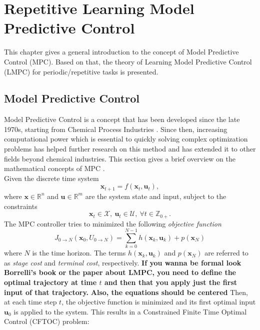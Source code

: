 \chapter{Repetitive Learning Model Predictive Control}
This chapter gives a general introduction to the concept of Model Predictive Control (MPC). Based on that, the theory of Learning Model Predictive Control (LMPC) for periodic/repetitive tasks is presented. %

\section{Model Predictive Control}
Model Predictive Control is a concept that has been developed since the late 1970s, starting from Chemical Process Industries \cite{garcia1989model}. Since then, increasing computational power which is essential to quickly solving complex optimization problems has helped further research on this method and has extended it to other fields beyond chemical industries.
This section gives a brief overview on the mathematical concepts of MPC \cite{Borrelli2003}.\\
Given the discrete time system
\begin{equation}
\bm{x}_{t+1}=f(\bm{x}_t,\bm{u}_t),
\end{equation}
where $\bm{x}\in \mathbb{R}^n$ and $\bm{u}\in\mathbb{R}^m$ are the system state and input, subject to the constraints
\begin{equation}
\bm{x}_t\in\mathcal{X},\ \bm{u}_t\in\mathcal{U},\ \forall t\in\mathbb{Z}_{0+}.
\end{equation}
The MPC controller tries to minimized the following \emph{objective function} 
\begin{equation}
J_{0\rightarrow N}(\bm{x}_0,U_{0\rightarrow N})=\sum_{k=0}^{N-1}h(\bm{x}_k,\bm{u}_k) + p(\bm{x}_N)
\end{equation}
where $N$ is the time horizon. The terms $h(\bm{x}_k,\bm{u}_k)$ and $p(\bm{x}_N)$ are referred to as \emph{stage cost} and \emph{terminal cost}, respectively. 
{\bfseries{If you wanna be formal look Borrelli's book or the paper about LMPC, you need to define the optimal trajectory at time $t$ and then that you apply just the first input of that trajectory.}} {\bfseries{Also, the equations should be centered}}
Then, at each time step $t$, the objective function is minimized and its first optimal input $\bm{u}_0$ is applied to the system. This results in a Constrained Finite Time Optimal Control (CFTOC) problem:
